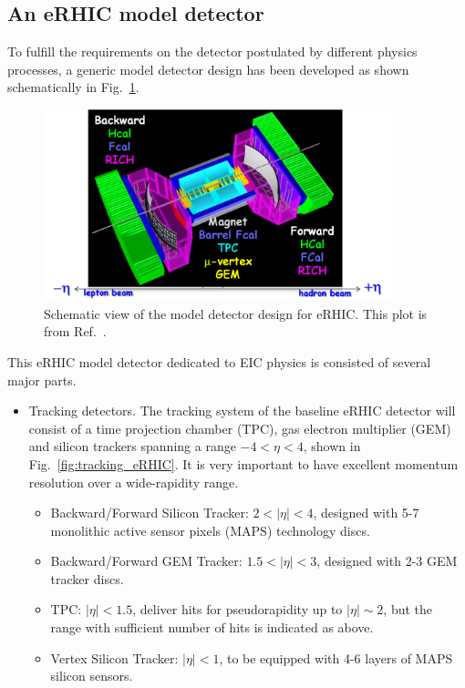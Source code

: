 \subsection{An eRHIC model detector}
To fulfill the requirements on the detector postulated by different physics processes, 
a generic model detector design has been developed as shown schematically in Fig.~\ref{fig:detector_eRHIC}.
\begin{figure}
\centering
\includegraphics[width=0.9\textwidth]{plots/chpt4/eRHIC_model_detector.png}
\caption[A schematic view of the eRHIC detector design]{
Schematic view of the model detector design for eRHIC. This plot is from Ref.~\cite{Aschenauer:2014a}.}
\label{fig:detector_eRHIC}
\end{figure}

This eRHIC model detector dedicated to EIC physics is consisted of several major parts.


\begin{itemize}
\item Tracking detectors. The tracking system of the baseline eRHIC detector
will consist of a time projection chamber (TPC), gas electron multiplier (GEM)
and silicon trackers spanning a range $-4<\eta<4$, shown in
Fig.~\ref{fig:tracking_eRHIC}. It is very important to have excellent momentum
resolution over a wide-rapidity range. 
\begin{itemize}
\item Backward/Forward Silicon Tracker: $2<|\eta|<4$, designed with 5-7 
monolithic active sensor pixels (MAPS) technology discs.

\item Backward/Forward GEM Tracker: $1.5<|\eta|<3$, designed with 2-3 GEM tracker discs.

\item TPC: $|\eta|<1.5$, deliver hits for pseudorapidity up to $|\eta|\sim2$, but the
range with sufficient number of hits is indicated as above. 

\item Vertex Silicon Tracker: $|\eta|<1$, to be equipped with 4-6 layers of MAPS silicon sensors.

\end{itemize}

\end{itemize}


